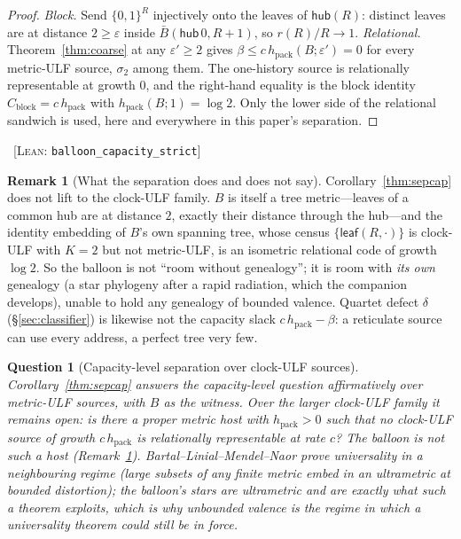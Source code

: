 \documentclass[11pt,reqno]{amsart}
\theoremstyle{plain}
\newtheorem{question}[theorem]{Question}
\theoremstyle{definition}
\newtheorem{remark}[theorem]{Remark}
\newcommand{\hpack}{h_{\mathrm{pack}}}
\newcommand{\Cblock}{C_{\mathrm{block}}}
\newcommand{\eps}{\varepsilon}
\newcommand{\cert}[1]{{\footnotesize\ [\textsc{Lean}: \texttt{#1}]}}
\begin{document}
\begin{proof}
\emph{Block.} Send $\{0,1\}^R$ injectively onto the leaves of $\mathsf{hub}(R)$: distinct leaves are at distance $2\ge\eps$ inside $\bar B(\mathsf{hub}\,0,R+1)$, so $r(R)/R\to1$. \emph{Relational.} Theorem~\ref{thm:coarse} at any $\eps'\ge2$ gives $\beta\le c\,\hpack(B;\eps')=0$ for every metric-ULF source, $\sigma_2$ among them. The one-history source is relationally representable at growth $0$, and the right-hand equality is the block identity $\Cblock=c\,\hpack$ with $\hpack(B;1)=\log2$. Only the lower side of the relational sandwich is used, here and everywhere in this paper's separation.
\end{proof}\cert{balloon\_\allowbreak{}capacity\_\allowbreak{}strict}

\begin{remark}[What the separation does and does not say]\label{rem:balloon}
Corollary~\ref{thm:sepcap} does not lift to the clock-ULF family. $B$ is itself a tree metric---leaves of a common hub are at distance $2$, exactly their distance through the hub---and the identity embedding of $B$'s own spanning tree, whose census $\{\mathsf{leaf}(R,\cdot)\}$ is clock-ULF with $K=2$ but not metric-ULF, is an isometric relational code of growth $\log2$. So the balloon is not ``room without genealogy''; it is room with \emph{its own} genealogy (a star phylogeny after a rapid radiation, which the companion develops), unable to hold any genealogy of bounded valence. Quartet defect $\delta$ (\S\ref{sec:classifier}) is likewise not the capacity slack $c\,\hpack-\beta$: a reticulate source can use every address, a perfect tree very few.
\end{remark}


\begin{question}[Capacity-level separation over clock-ULF sources]\label{q:sep}
Corollary~\ref{thm:sepcap} answers the capacity-level question affirmatively over metric-ULF sources, with $B$ as the witness. Over the larger clock-ULF family it remains open: is there a proper metric host with $\hpack>0$ such that \emph{no} clock-ULF source of growth $c\,\hpack$ is relationally representable at rate $c$? The balloon is not such a host (Remark~\ref{rem:balloon}). Bartal--Linial--Mendel--Naor \cite{blmn2005} prove universality in a neighbouring regime (large subsets of any finite metric embed in an ultrametric at bounded distortion); the balloon's stars are ultrametric and are exactly what such a theorem exploits, which is why unbounded valence is the regime in which a universality theorem could still be in force.
\end{question}
\end{document}
